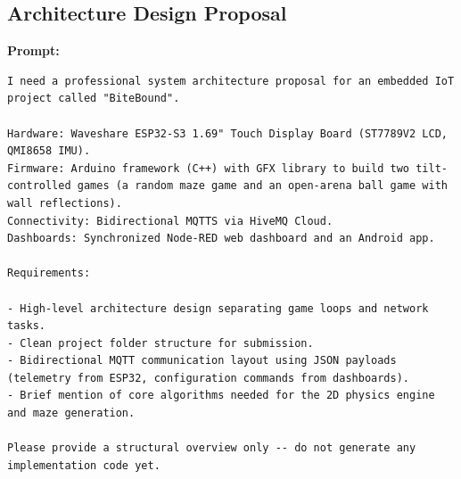 \subsection*{Architecture Design Proposal}

\textbf{Prompt:}
\begin{lstlisting}[language={}, breaklines=true]
I need a professional system architecture proposal for an embedded IoT project called "BiteBound".

Hardware: Waveshare ESP32-S3 1.69" Touch Display Board (ST7789V2 LCD, QMI8658 IMU).
Firmware: Arduino framework (C++) with GFX library to build two tilt-controlled games (a random maze game and an open-arena ball game with wall reflections).
Connectivity: Bidirectional MQTTS via HiveMQ Cloud.
Dashboards: Synchronized Node-RED web dashboard and an Android app.

Requirements:

- High-level architecture design separating game loops and network tasks.
- Clean project folder structure for submission.
- Bidirectional MQTT communication layout using JSON payloads (telemetry from ESP32, configuration commands from dashboards).
- Brief mention of core algorithms needed for the 2D physics engine and maze generation.

Please provide a structural overview only -- do not generate any implementation code yet.
\end{lstlisting}

